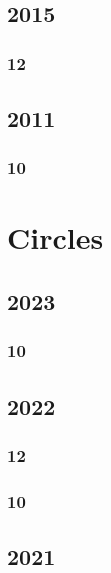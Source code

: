 \documentclass[11pt]{book}
\begin{document}
\section{2015}
\subsection{12}


\section{2011}
\subsection{10}



%

\chapter{Circles}
\section{2023}
\subsection{10}

\section{2022}
\subsection{12}

\subsection{10}


\section{2021}
\end{document}
